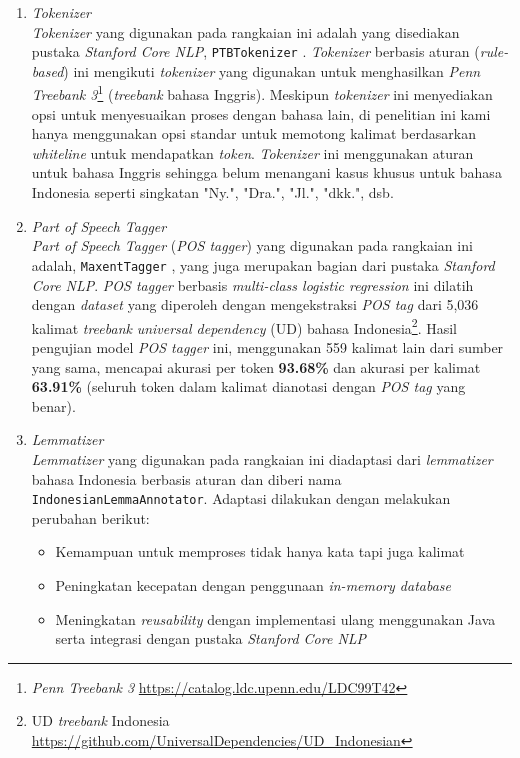 \begin{enumerate}

\item \textit{Tokenizer} \\
\textit{Tokenizer} yang digunakan pada rangkaian ini adalah yang disediakan pustaka \textit{Stanford Core NLP}, \verb|PTBTokenizer| \citep{manningptbtokenizer}. \textit{Tokenizer} berbasis aturan (\textit{rule-based}) ini mengikuti \textit{tokenizer} yang digunakan untuk menghasilkan \textit{Penn Treebank 3}\footnote{\textit{Penn Treebank 3} \url{https://catalog.ldc.upenn.edu/LDC99T42}} (\textit{treebank} bahasa Inggris). Meskipun \textit{tokenizer} ini menyediakan opsi untuk menyesuaikan proses dengan bahasa lain, di penelitian ini kami hanya menggunakan opsi standar untuk memotong kalimat berdasarkan \textit{whiteline} untuk mendapatkan \textit{token}. \textit{Tokenizer} ini menggunakan aturan untuk bahasa Inggris sehingga belum menangani kasus khusus untuk bahasa Indonesia seperti singkatan "Ny.", "Dra.", "Jl.", "dkk.", dsb.

\item \textit{Part of Speech Tagger} \\ 
\textit{Part of Speech Tagger} (\textit{POS tagger}) yang digunakan pada rangkaian ini adalah, \verb|MaxentTagger| \citep{toutanova2003feature}, yang juga merupakan bagian dari pustaka \textit{Stanford Core NLP}. \textit{POS tagger} berbasis \textit{multi-class logistic regression} ini dilatih dengan \textit{dataset} yang diperoleh dengan mengekstraksi \textit{POS tag} dari 5,036 kalimat \textit{treebank} \textit{universal dependency} (UD) bahasa Indonesia\footnote{UD \textit{treebank} Indonesia \url{https://github.com/UniversalDependencies/UD_Indonesian}}. Hasil pengujian model \textit{POS tagger} ini, menggunakan 559 kalimat lain dari sumber yang sama, mencapai akurasi per token \textbf{93.68\%} dan akurasi per kalimat \textbf{63.91\%} (seluruh token dalam kalimat dianotasi dengan \textit{POS tag} yang benar).

\item \textit{Lemmatizer} \\
\textit{Lemmatizer} yang digunakan pada rangkaian ini diadaptasi dari \textit{lemmatizer} bahasa Indonesia berbasis aturan \citep{suhartono2014lemmatization} dan diberi nama \verb|IndonesianLemmaAnnotator|. Adaptasi dilakukan dengan melakukan perubahan berikut:

\begin{itemize}
\item Kemampuan untuk memproses tidak hanya kata tapi juga kalimat
\item Peningkatan kecepatan dengan penggunaan \textit{in-memory database}
\item Meningkatan \textit{reusability} dengan implementasi ulang menggunakan Java serta integrasi dengan pustaka \textit{Stanford Core NLP}
\end{itemize}


\end{enumerate}
